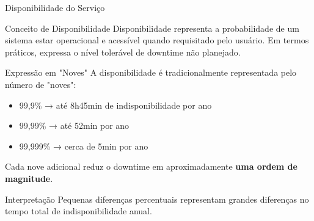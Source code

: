 \documentclass[9pt]{beamer}
\begin{document}
\begin{frame}{Disponibilidade do Serviço}

\begin{block}{Conceito de Disponibilidade}
Disponibilidade representa a probabilidade de um sistema estar
operacional e acessível quando requisitado pelo usuário.
Em termos práticos, expressa o nível tolerável de downtime não planejado.
\end{block}

\begin{block}{Expressão em "Noves"}
A disponibilidade é tradicionalmente representada pelo número de "noves":

\begin{itemize}
    \item 99,9\%  → até 8h45min de indisponibilidade por ano
    \item 99,99\% → até 52min por ano
    \item 99,999\% → cerca de 5min por ano
\end{itemize}

Cada nove adicional reduz o downtime em aproximadamente
\textbf{uma ordem de magnitude}.
\end{block}

\begin{alertblock}{Interpretação}
Pequenas diferenças percentuais representam grandes diferenças
no tempo total de indisponibilidade anual.
\end{alertblock}

\begin{center}
\end{center}

\end{frame} 
\end{document}
